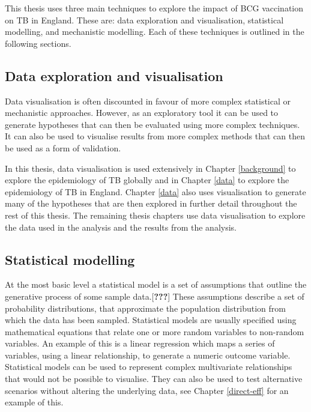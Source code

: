 \documentclass[11pt,twoside]{bristolthesis}
\begin{document}
  This thesis uses three main techniques to explore the impact of BCG vaccination on TB in England. These are: data exploration and visualisation, statistical modelling, and mechanistic modelling. Each of these techniques is outlined in the following sections.
  
  \hypertarget{data-exploration-and-visualisation}{%
  \subsection{Data exploration and visualisation}\label{data-exploration-and-visualisation}}
  
  Data visualisation is often discounted in favour of more complex statistical or mechanistic approaches. However, as an exploratory tool it can be used to generate hypotheses that can then be evaluated using more complex techniques. It can also be used to visualise results from more complex methods that can then be used as a form of validation.
  
  In this thesis, data visualisation is used extensively in Chapter \ref{background} to explore the epidemiology of TB globally and in Chapter \ref{data} to explore the epidemiology of TB in England. Chapter \ref{data} also uses visualisation to generate many of the hypotheses that are then explored in further detail throughout the rest of this thesis. The remaining thesis chapters use data visualisation to explore the data used in the analysis and the results from the analysis.
  
  \hypertarget{statistical-modelling}{%
  \subsection{Statistical modelling}\label{statistical-modelling}}
  
  At the most basic level a statistical model is a set of assumptions that outline the generative process of some sample data.{[}{\textbf{???}}{]} These assumptions describe a set of probability distributions, that approximate the population distribution from which the data has been sampled. Statistical models are usually specified using mathematical equations that relate one or more random variables to non-random variables. An example of this is a linear regression which maps a series of variables, using a linear relationship, to generate a numeric outcome variable. Statistical models can be used to represent complex multivariate relationships that would not be possible to visualise. They can also be used to test alternative scenarios without altering the underlying data, see Chapter \ref{direct-eff} for an example of this.
  
\end{document}
